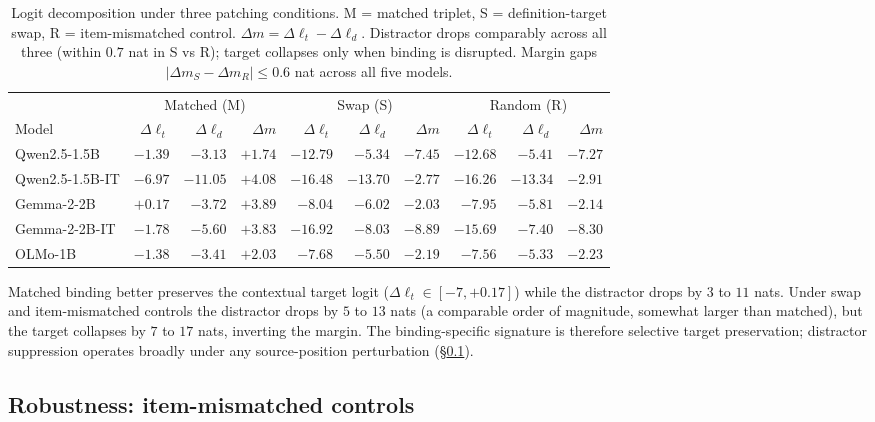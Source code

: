\documentclass[11pt]{article}
\begin{document}
\begin{table}[t]
\centering
\scriptsize
\setlength{\tabcolsep}{3pt}
\begin{tabular*}{\textwidth}{@{\extracolsep{\fill}}lrrrrrrrrr@{}}
\toprule
& \multicolumn{3}{c}{Matched (M)} & \multicolumn{3}{c}{Swap (S)} & \multicolumn{3}{c}{Random (R)} \\
\cmidrule(lr){2-4} \cmidrule(lr){5-7} \cmidrule(lr){8-10}
Model & $\Delta\ell_t$ & $\Delta\ell_d$ & $\Delta m$ & $\Delta\ell_t$ & $\Delta\ell_d$ & $\Delta m$ & $\Delta\ell_t$ & $\Delta\ell_d$ & $\Delta m$ \\
\midrule
Qwen2.5-1.5B    & $-1.39$ & $-3.13$  & $+1.74$ & $-12.79$ & $-5.34$  & $-7.45$ & $-12.68$ & $-5.41$  & $-7.27$ \\
Qwen2.5-1.5B-IT & $-6.97$ & $-11.05$ & $+4.08$ & $-16.48$ & $-13.70$ & $-2.77$ & $-16.26$ & $-13.34$ & $-2.91$ \\
Gemma-2-2B      & $+0.17$ & $-3.72$  & $+3.89$ & $-8.04$  & $-6.02$  & $-2.03$ & $-7.95$  & $-5.81$  & $-2.14$ \\
Gemma-2-2B-IT   & $-1.78$ & $-5.60$  & $+3.83$ & $-16.92$ & $-8.03$  & $-8.89$ & $-15.69$ & $-7.40$  & $-8.30$ \\
OLMo-1B         & $-1.38$ & $-3.41$  & $+2.03$ & $-7.68$  & $-5.50$  & $-2.19$ & $-7.56$  & $-5.33$  & $-2.23$ \\
\bottomrule
\end{tabular*}
\caption{Logit decomposition under three patching conditions. M = matched triplet,
S = definition-target swap, R = item-mismatched control. $\Delta m = \Delta\ell_t -
\Delta\ell_d$. Distractor drops comparably across all three (within $0.7$ nat in S vs R);
target collapses only when binding is disrupted. Margin gaps
$|\Delta m_S - \Delta m_R| \leq 0.6$ nat across all five models.}
\label{tab:logit_decomp_all}
\end{table}

Matched binding better preserves the contextual target logit ($\Delta\ell_t \in
[-7, +0.17]$) while the distractor drops by $3$ to $11$ nats. Under swap and item-mismatched
controls the distractor drops by $5$ to $13$ nats (a comparable order of magnitude, somewhat
larger than matched), but the target collapses by $7$ to $17$ nats, inverting the margin. The
binding-specific signature is therefore selective target preservation; distractor suppression
operates broadly under any source-position perturbation (\S\ref{sec:robustness}).

\subsection{Robustness: item-mismatched controls}
\label{sec:robustness}
\end{document}
